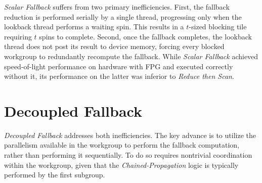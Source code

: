 \documentclass[sigconf]{acmart}
\begin{document}
\emph{Scalar Fallback} suffers from two primary inefficiencies. First, the fallback reduction is performed serially by a single thread, progressing only when the lookback thread performs a waiting spin. This results in a $t$-sized blocking tile requiring $t$ spins to complete. Second, once the fallback completes, the lookback thread does not post its result to device memory, forcing every blocked workgroup to redundantly recompute the fallback. While \emph{Scalar Fallback} achieved speed-of-light performance on hardware with FPG and executed correctly without it, its performance on the latter was inferior to \emph{Reduce then Scan}.

\section{Decoupled Fallback}
\emph{Decoupled Fallback} addresses both inefficiencies. The key advance is to utilize the parallelism available in the workgroup to perform the fallback computation, rather than performing it sequentially. To do so requires nontrivial coordination within the workgroup, given that the \emph{Chained-Propagation} logic is typically performed by the first subgroup.
\end{document}
